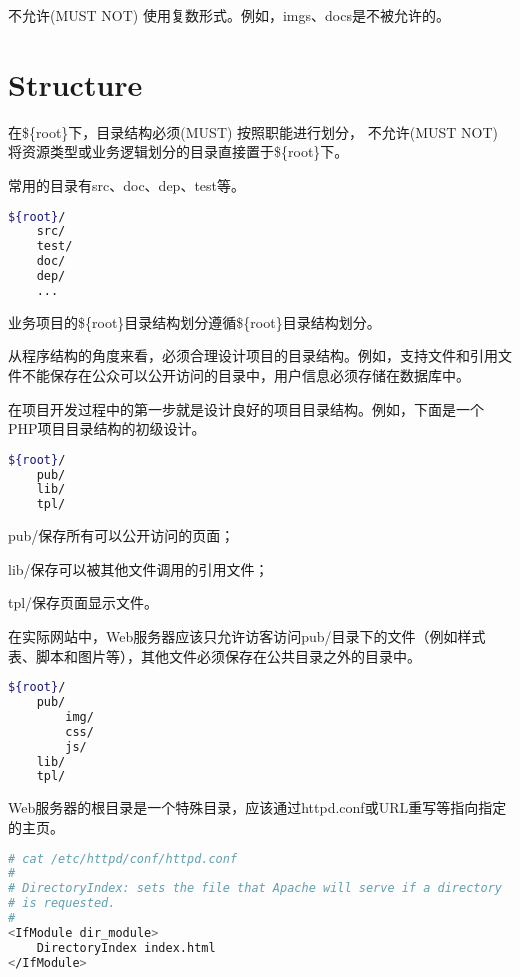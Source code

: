 不允许(MUST NOT) 使用复数形式。例如，imgs、docs是不被允许的。

\section{Structure}

在\$\{root\}下，目录结构必须(MUST) 按照职能进行划分， 不允许(MUST NOT) 将资源类型或业务逻辑划分的目录直接置于\$\{root\}下。

常用的目录有src、doc、dep、test等。

\begin{lstlisting}[language=bash]
${root}/
    src/
    test/
    doc/
    dep/
    ...
\end{lstlisting}


业务项目的\$\{root\}目录结构划分遵循\$\{root\}目录结构划分。


从程序结构的角度来看，必须合理设计项目的目录结构。例如，支持文件和引用文件不能保存在公众可以公开访问的目录中，用户信息必须存储在数据库中。

在项目开发过程中的第一步就是设计良好的项目目录结构。例如，下面是一个PHP项目目录结构的初级设计。

\begin{lstlisting}[language=bash]
${root}/
    pub/
    lib/
    tpl/
\end{lstlisting}


\begin{compactitem}
\item pub/保存所有可以公开访问的页面；
\item lib/保存可以被其他文件调用的引用文件；
\item tpl/保存页面显示文件。
\end{compactitem}

在实际网站中，Web服务器应该只允许访客访问pub/目录下的文件（例如样式表、脚本和图片等），其他文件必须保存在公共目录之外的目录中。


\begin{lstlisting}[language=bash]
${root}/
    pub/
        img/
        css/
        js/
    lib/
    tpl/
\end{lstlisting}


Web服务器的根目录是一个特殊目录，应该通过httpd.conf或URL重写等指向指定的主页。


\begin{lstlisting}[language=bash]
# cat /etc/httpd/conf/httpd.conf
#
# DirectoryIndex: sets the file that Apache will serve if a directory
# is requested.
#
<IfModule dir_module>
    DirectoryIndex index.html
</IfModule>
\end{lstlisting}

